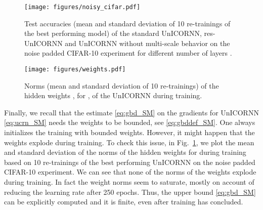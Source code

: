 \documentclass{article}
\newcommand{\fref}[1] {Fig.~\ref{#1}}
\begin{document}
\begin{figure}[ht!]
\centering
\begin{minipage}[t]{.48\textwidth}
\texttt{[image: figures/noisy\_cifar.pdf]}
\caption{Test accuracies (mean and standard deviation of 10 re-trainings of the best performing model) of the standard UnICORNN, res-UnICORNN and UnICORNN without multi-scale behavior on the noise padded CIFAR-10 experiment for different number of layers .}
\label{fig:cifar}
\end{minipage}\hspace{0.01\textwidth}
\begin{minipage}[t]{.48\textwidth}
\texttt{[image: figures/weights.pdf]}
\caption{Norms (mean and standard deviation of 10 re-trainings) of the hidden weights , for , of the UnICORNN during training.}
\label{fig:weights}
\end{minipage}
\end{figure}

Finally, we recall that the estimate \eqref{eq:gbd_SM} on the gradients for UnICORNN \eqref{eq:ucrn_SM} needs the weights to be bounded, see \eqref{eq:gbddef_SM}. One always initializes the training with bounded weights. However, it might happen that the weights explode during training. To check this issue, in  \fref{fig:weights}, we plot the mean and standard deviation of the norms of the hidden weights  for  during training based on 10 re-trainings of the best performing UnICORNN on the noise padded CIFAR-10 experiment. We can see that none of the norms of the weights explode during training. In fact the weight norms seem to saturate, mostly on account of reducing the learning rate after 250 epochs. Thus, the upper bound \eqref{eq:gbd_SM} can be explicitly computed and it is finite, even after training has concluded.
\end{document}
